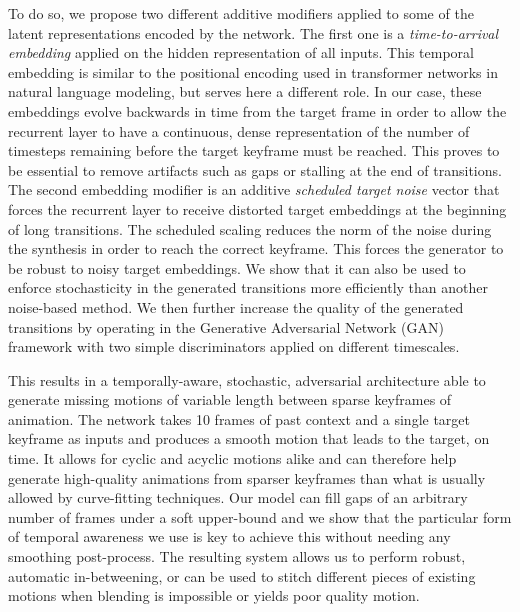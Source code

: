 \documentclass[acmtog]{acmart}
\begin{document}
To do so, we propose two different additive modifiers applied to some of the latent representations encoded by the network. The first one is a \textit{time-to-arrival embedding} applied on the hidden representation of all inputs. This temporal embedding is similar to the positional encoding used in transformer networks \cite{vaswani2017attention} in natural language modeling, but serves here a different role. In our case, these embeddings evolve backwards in time from the target frame in order to allow the recurrent layer to have a continuous, dense representation of the number of timesteps remaining before the target keyframe must be reached. This proves to be essential to remove artifacts such as gaps or stalling at the end of transitions. The second embedding modifier is an additive \textit{scheduled target noise} vector that forces the recurrent layer to receive distorted target embeddings at the beginning of long transitions. The scheduled scaling reduces the norm of the noise during the synthesis in order to reach the correct keyframe. This forces the generator to be robust to noisy target embeddings. We show that it can also be used to enforce stochasticity in the generated transitions more efficiently than another noise-based method. We then further increase the quality of the generated transitions by operating in the Generative Adversarial Network (GAN) framework with two simple discriminators applied on different timescales.


This results in a temporally-aware, stochastic, adversarial architecture able to generate missing motions of variable length between sparse keyframes of animation. The network takes 10 frames of past context and a single target keyframe as inputs and produces a smooth motion that leads to the target, on time. It allows for cyclic and acyclic motions alike and can therefore help generate high-quality animations from sparser keyframes than what is usually allowed by curve-fitting techniques. Our model can fill gaps of an arbitrary number of frames under a soft upper-bound and we show that the particular form of temporal awareness we use is key to achieve this without needing any smoothing post-process. The resulting system allows us to perform robust, automatic in-betweening, or can be used to stitch different pieces of existing motions when blending is impossible or yields poor quality motion. 
\end{document}
